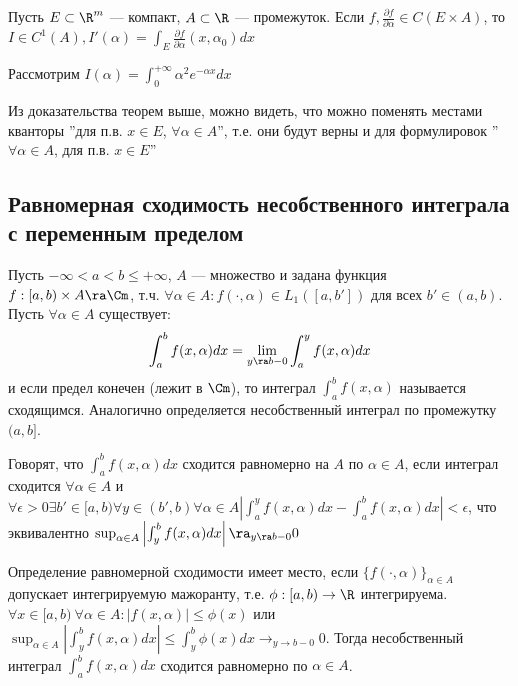 \begin{corollary}
    Пусть \(E \subset \R^m\) --- компакт, \(A \subset \R\) --- промежуток. Если \(f, \frac{\partial f}{\partial \alpha} \in C(E \times A)\), то \(I \in C^1(A), I'(\alpha) = \int_E \frac{\partial f}{\partial \alpha}(x, \alpha_0) dx\)
\end{corollary}

\begin{example}
    Рассмотрим \(I(\alpha) = \int_0^{+\infty} \alpha^2e^{-\alpha x} dx\)
\end{example}

\begin{note}
    Из доказательства теорем выше, можно видеть, что можно поменять местами кванторы ''для п.в. \(x \in E\), \(\forall \alpha \in A\)'', т.е. они будут верны и для формулировок ''\(\forall \alpha \in A\), для п.в. \(x \in E\)''
\end{note}

\subsection{Равномерная сходимость несобственного интеграла с переменным пределом}
\begin{definition}
    Пусть \(-\infty < a < b \le +\infty\), \(A\) --- множество и задана функция \(f: [a, b) \times A \ra \Cm\), т.ч. \(\forall \alpha \in A: f(\cdot, \alpha) \in L_1([a, b'])\) для всех \(b' \in (a, b)\). Пусть \(\forall \alpha \in A\) существует:
    \[\int_a^b f(x, \alpha) dx = \lim_{y \ra b-0} \int^y_a f(x, \alpha) dx\]
    и если предел конечен (лежит в \(\Cm\)), то интеграл \(\int_a^b f(x, \alpha)\) называется сходящимся. Аналогично определяется несобственный интеграл по промежутку \((a, b]\).
\end{definition}

\begin{definition}
    Говорят, что \(\int_a^b f(x, \alpha) dx\) сходится равномерно на \(A\) по \(\alpha \in A\), если интеграл сходится \(\forall \alpha \in A\) и \(\forall \epsilon > 0 \exists b' \in [a, b) \forall y \in (b', b) \forall \alpha \in A \left| \int_a^y f(x, \alpha) dx - \int_a^b f(x, \alpha) dx \right| < \epsilon\), что эквивалентно \(\sup_{\alpha \in A} \left| \int_y^b f(x, \alpha) dx \right| \ra_{y \ra b - 0} 0\)
\end{definition}

\begin{note}
    Определение равномерной сходимости имеет место, если \(\{f(\cdot, \alpha)\}_{\alpha \in A}\) допускает интегрируемую мажоранту, т.е. \(\phi: [a, b) \to \R\) интегрируема. \(\forall x \in [a, b) \ \forall \alpha \in A: |f(x, \alpha)| \le \phi(x)\) или \(\sup_{\alpha \in A} \left| \int_y^b f(x, \alpha) dx \right| \le \int_y^b \phi(x)dx \to_{y \to b-0} 0\).  
    Тогда несобственный интеграл \(\int_a^b f(x,\alpha)dx\) сходится равномерно по \(\alpha \in A\).
\end{note}


